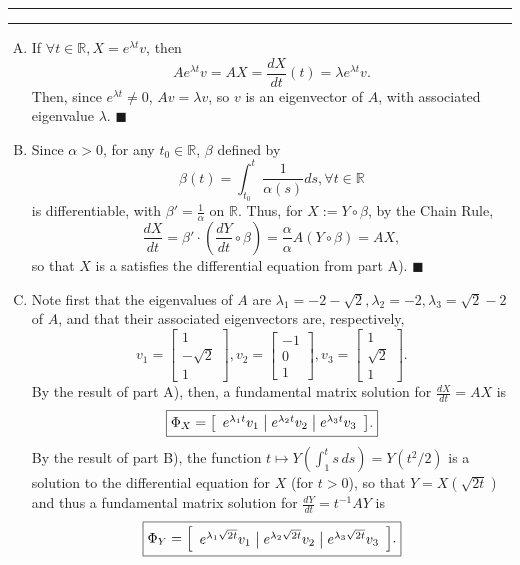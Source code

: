 \documentclass[11pt]{article}
\newcounter{questionCounter}
\newcounter{partCounter}[questionCounter]
\newenvironment{question}[2][\arabic{questionCounter}]{%
    \setcounter{partCounter}{0}%
    \vspace{.25in} \hrule \vspace{0.5em}%
        \noindent{\bf #2}%
    \vspace{0.8em} \hrule \vspace{.10in}%
    \addtocounter{questionCounter}{1}%
}{}
\renewcommand{\qed}{\quad $\blacksquare$}
\newcommand{\inv}{^{-1}}
\newcommand{\R}{\mathbb{R}} %
\begin{document}
\begin{question}{Problem 2}
\begin{enumerate}[A)]
\item If $\forall t \in \R, X = e^{\lambda t}v$, then
\[Ae^{\lambda t}v = AX = \frac{dX}{dt}(t) = \lambda e^{\lambda t}v.\]
Then, since $e^{\lambda t} \neq 0$, $Av = \lambda v$, so $v$ is an
eigenvector of $A$, with associated eigenvalue $\lambda$. \qed

\item Since $\alpha > 0$, for any $t_0 \in \R$, $\beta$ defined by
\[\beta(t) = \int_{t_0}^t\frac{1}{\alpha(s)}ds, \forall t \in \R\]
is differentiable, with $\beta' = \frac{1}{\alpha}$ on $\R$. Thus, for
$X := Y \circ \beta$, by the Chain Rule,
\[\frac{dX}{dt} = \beta'\cdot \left(\frac{dY}{dt}\circ \beta\right)
 = \frac{\alpha}{\alpha} A(Y \circ \beta) = AX,\]
so that $X$ is a satisfies the differential equation from part A). \qed

\item Note first that the eigenvalues of $A$ are $\lambda_1 = -2 - \sqrt2,
\lambda_2 = -2, \lambda_3 = \sqrt2 - 2$ of $A$, and that their associated
eigenvectors are, respectively,
\[v_1 = \left[
            \begin{array}{c}
                1       \\
                -\sqrt2 \\
                1
            \end{array}
        \right],
v_2 = \left[
            \begin{array}{c}
                -1      \\
                0       \\
                1
            \end{array}
        \right],
v_3 = \left[
            \begin{array}{c}
                1       \\
                \sqrt2  \\
                1
            \end{array}
        \right].
\]
By the result of part A), then, a fundamental matrix solution for
$\frac{dX}{dt} = AX$ is
\[\mbox{\fbox{$\displaystyle
\Phi_X = \left[
            \begin{array}{c}
                e^{\lambda_1 t} v_1 \; \big| \;
                e^{\lambda_2 t} v_2 \; \big| \;
                e^{\lambda_3t } v_3
            \end{array}
        \right]
$.}}
\]
By the result of part B), the function $t \mapsto Y(\int_1^t s \, ds)
 = Y\left(t^2/2\right)$ is a solution to the differential equation for $X$ (for
$t > 0$), so that $Y = X(\sqrt{2t})$ and thus a fundamental matrix solution for
$\frac{dY}{dt} = t\inv AY$ is
\[\mbox{\fbox{$\displaystyle
\Phi_Y = \left[
            \begin{array}{c}
                e^{\lambda_1 \sqrt{2t}}v_1 \; \big| \;
                e^{\lambda_2 \sqrt{2t}}v_2 \; \big| \;
                e^{\lambda_3 \sqrt{2t}} v_3
            \end{array}
        \right]
$.}}
\]
\end{enumerate}
\end{question}
\end{document}
